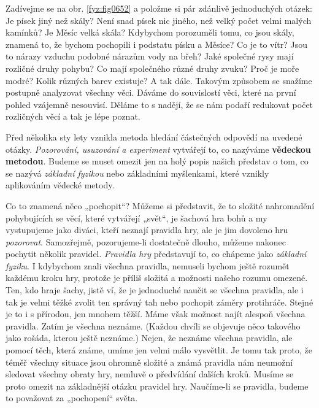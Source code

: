     Zadívejme se na obr. \ref{fyz:fig0652} a položme si pár zdánlivě jednoduchých otázek: Je písek
    jiný než skály? Není snad písek nic jiného, než velký počet velmi malých kamínků? Je Měsíc velká
    skála? Kdybychom porozuměli tomu, co jsou skály, znamená to, že bychom pochopili i podstatu
    písku a Měsíce? Co je to vítr? Jsou to nárazy vzduchu podobné nárazům vody na břeh? Jaké
    společné rysy mají rozličné druhy pohybu? Co mají společného různé druhy zvuku? Proč je moře
    modré? Kolik různých barev existuje? A tak dále. Takovým způsobem se snažíme postupně analyzovat
    všechny věci. Dáváme do souvislostí věci, které na první pohled vzájemně nesouvisí. Děláme to s
    nadějí, že se nám podaří redukovat počet rozličných věcí a tak je lépe poznat.

    
    Před několika sty lety vznikla metoda hledání částečných odpovědí na uvedené otázky. 
    \emph{Pozorování, usuzování a experiment} vytvářejí to, co nazýváme \textbf{vědeckou metodou}. 
    Budeme se muset omezit jen na holý popis našich představ o tom, co se nazývá \emph{základní 
    fyzikou} nebo základními myšlenkami, které vznikly aplikováním vědecké metody.
    
    Co to znamená něco „pochopit“? Můžeme si představit, že to složité nahromadění pohybujících se 
    věcí, které vytvářejí „svět“, je šachová hra bohů a my vystupujeme jako diváci, kteří neznají 
    pravidla hry, ale je jim dovoleno hru \emph{pozorovat}. Samozřejmě, pozorujeme-li dostatečně 
    dlouho, můžeme nakonec pochytit několik pravidel. \emph{Pravidla hry} představují to, co 
    chápeme jako \emph{základní fyziku}. I  kdybychom znali všechna pravidla, nemuseli bychom ještě 
    rozumět každému kroku hry, protože je příliš složitá a možnosti našeho rozumu omezené. 
    Ten, kdo hraje šachy, jistě ví, že je jednoduché naučit se všechna pravidla, ale i tak je velmi 
    těžké zvolit ten správný tah nebo pochopit záměry protihráče. Stejné je to i s přírodou, jen 
    mnohem těžší. Máme však možnost najít alespoň všechna pravidla. Zatím je všechna neznáme. 
    (Každou chvíli se objevuje něco takového jako rošáda, kterou ještě neznáme.) Nejen, že neznáme 
    všechna pravidla, ale pomocí těch, která známe, umíme jen velmi málo vysvětlit. Je tomu tak 
    proto, že téměř všechny situace jsou ohromně složité a známá pravidla nám neumožní sledovat 
    všechny obraty hry, nemluvě o předvídání dalších kroků. Musíme se proto omezit na základnější 
    otázku pravidel hry. Naučíme-li se pravidla, budeme to považovat za „pochopení“ světa.
    
